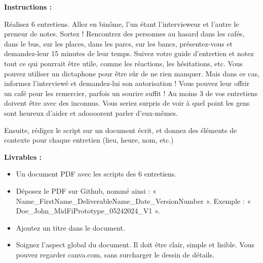 \makeheaderfiles

\textbf{Instructions :}

Réalisez 6 entretiens. Allez en binôme, l'un étant l'intervieweur et l'autre le preneur de notes.
Sortez ! Rencontrez des personnes au hasard dans les cafés, dans le bus, sur les places, dans les parcs, sur les bancs, présentez-vous et demandez-leur 15 minutes de leur temps. Suivez votre guide d'entretien et notez tout ce qui pourrait être utile, comme les réactions, les hésitations, etc. Vous pouvez utiliser un dictaphone pour être sûr de ne rien manquer. Mais dans ce cas, informez l'interviewé et demandez-lui son autorisation !
Vous pouvez leur offrir un café pour les remercier, parfois un sourire suffit !
Au moins 3 de vos entretiens doivent être avec des inconnus. Vous seriez surpris de voir à quel point les gens sont heureux d'aider et adoooorent parler d'eux-mêmes.

Ensuite, rédigez le script sur un document écrit, et donnez des éléments de contexte pour chaque entretien (lieu, heure, nom, etc.)

\textbf{Livrables :}

\begin{itemize}
\item Un document PDF avec les scripts des 6 entretiens.
\item Déposez le PDF sur Github, nommé ainsi : « Name\_FirstName\_DeliverableName\_Date\_VersionNumber ». Exemple : « Doe\_John\_MidFiPrototype\_05242024\_V1 ».
\item Ajoutez un titre dans le document.
\item Soignez l'aspect global du document. Il doit être clair, simple et lisible. Vous pouvez regarder canva.com, sans surcharger le dessin de détails.
\end{itemize}

